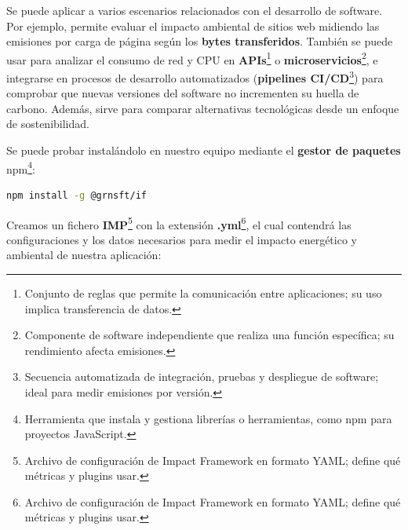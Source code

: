 \documentclass[12pt,a4paper]{report}
\begin{document}
Se puede aplicar a varios escenarios relacionados con el desarrollo de
software. Por ejemplo, permite evaluar el impacto ambiental de sitios web
midiendo las emisiones por carga de página según los \textbf{bytes
  transferidos}. También se puede usar
para analizar el consumo de red y CPU en \textbf{APIs}\footnote{Conjunto de
  reglas que permite la comunicación entre aplicaciones; su uso implica
  transferencia de datos.} o \textbf{microservicios}\footnote{Componente de
  software independiente que realiza una función específica; su rendimiento
  afecta emisiones.}, e integrarse en procesos de desarrollo automatizados
(\textbf{pipelines CI/CD}\footnote{Secuencia automatizada de integración,
  pruebas y despliegue de software; ideal para medir emisiones por versión.})
para comprobar que nuevas versiones del software no incrementen su huella de
carbono. Además, sirve para comparar alternativas tecnológicas desde un enfoque
de sostenibilidad.

Se puede probar instalándolo en nuestro equipo mediante el \textbf{gestor de
  paquetes} npm\footnote{Herramienta que instala y gestiona librerías o
  herramientas, como npm para proyectos JavaScript.}:

\begin{tcolorbox}[colback=codebackground, colframe=codeborder, boxrule=0.8pt, arc=0mm, boxsep=5pt, left=5pt, right=5pt, top=5pt, bottom=5pt]
  \begin{lstlisting}[language=bash]
  npm install -g @grnsft/if
  \end{lstlisting}
\end{tcolorbox}

Creamos un fichero \textbf{IMP}\footnote{Archivo de configuración de Impact
  Framework en formato YAML; define qué métricas y plugins usar.} con la
extensión \textbf{.yml}\footnote{Archivo de configuración de Impact Framework
  en formato YAML; define qué métricas y plugins usar.}, el cual contendrá las
configuraciones y los datos necesarios para medir el impacto energético y
ambiental de nuestra aplicación:
\end{document}
